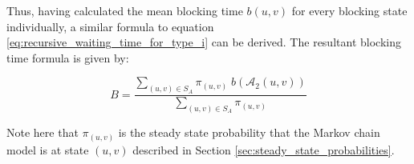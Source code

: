 Thus, having calculated the mean blocking time \(b(u,v)\) for every blocking
state individually, a similar formula to equation
\ref{eq:recursive_waiting_time_for_type_i} can be derived.
The resultant blocking time formula is given by:

\begin{equation}\label{eq:blocking_time_formula}
    B = \frac{\sum_{(u,v) \in S_A} \pi_{(u,v)} \; b(\mathcal{A}_2(u,v))}{
        \sum_{(u,v) \in S_A}\pi_{(u,v)}}
\end{equation}

Note here that \(\pi_(u,v)\) is the steady state probability that the Markov
chain model is at state \((u,v)\) described in Section
\ref{sec:steady_state_probabilities}.
